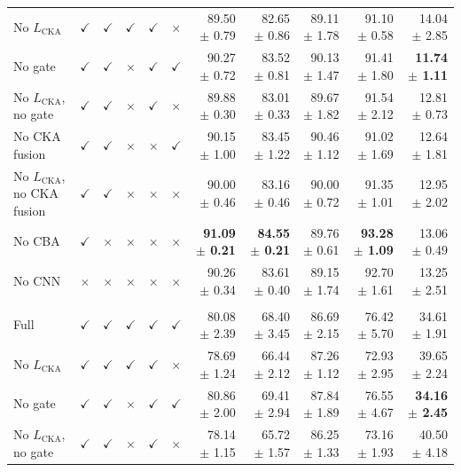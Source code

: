 \documentclass[10pt]{article}
\begin{document}
{\begin{longtable}{lccccc rrrrr}
No $L_{\mathrm{CKA}}$ & $\checkmark$ & $\checkmark$ & $\checkmark$ & $\checkmark$ & $\times$ & 89.50 $\pm$ 0.79 & 82.65 $\pm$ 0.86 & 89.11 $\pm$ 1.78 & 91.10 $\pm$ 0.58 & 14.04 $\pm$ 2.85 \\
No gate & $\checkmark$ & $\checkmark$ & $\times$ & $\checkmark$ & $\checkmark$ & 90.27 $\pm$ 0.72 & 83.52 $\pm$ 0.81 & 90.13 $\pm$ 1.47 & 91.41 $\pm$ 1.80 & \textbf{11.74 $\pm$ 1.11} \\
No $L_{\mathrm{CKA}}$, no gate & $\checkmark$ & $\checkmark$ & $\times$ & $\checkmark$ & $\times$ & 89.88 $\pm$ 0.30 & 83.01 $\pm$ 0.33 & 89.67 $\pm$ 1.82 & 91.54 $\pm$ 2.12 & 12.81 $\pm$ 0.73 \\
No CKA fusion & $\checkmark$ & $\checkmark$ & $\times$ & $\times$ & $\checkmark$ & 90.15 $\pm$ 1.00 & 83.45 $\pm$ 1.22 & 90.46 $\pm$ 1.12 & 91.02 $\pm$ 1.69 & 12.64 $\pm$ 1.81 \\
No $L_{\mathrm{CKA}}$, no CKA fusion & $\checkmark$ & $\checkmark$ & $\times$ & $\times$ & $\times$ & 90.00 $\pm$ 0.46 & 83.16 $\pm$ 0.46 & 90.00 $\pm$ 0.72 & 91.35 $\pm$ 1.01 & 12.95 $\pm$ 2.02 \\
No CBA & $\checkmark$ & $\times$ & $\times$ & $\times$ & $\times$ & \textbf{91.09 $\pm$ 0.21} & \textbf{84.55 $\pm$ 0.21} & 89.76 $\pm$ 0.61 & \textbf{93.28 $\pm$ 1.09} & 13.06 $\pm$ 0.49 \\
No CNN & $\times$ & $\times$ & $\times$ & $\times$ & $\times$ & 90.26 $\pm$ 0.34 & 83.61 $\pm$ 0.40 & 89.15 $\pm$ 1.74 & 92.70 $\pm$ 1.61 & 13.25 $\pm$ 2.51 \\
\addlinespace[4pt]
\multicolumn{11}{l}{\textit{Source: OVATUS $\rightarrow$ Target: USOVA}} \\
\midrule
Full & $\checkmark$ & $\checkmark$ & $\checkmark$ & $\checkmark$ & $\checkmark$ & 80.08 $\pm$ 2.39 & 68.40 $\pm$ 3.45 & 86.69 $\pm$ 2.15 & 76.42 $\pm$ 5.70 & 34.61 $\pm$ 1.91 \\
No $L_{\mathrm{CKA}}$ & $\checkmark$ & $\checkmark$ & $\checkmark$ & $\checkmark$ & $\times$ & 78.69 $\pm$ 1.24 & 66.44 $\pm$ 2.12 & 87.26 $\pm$ 1.12 & 72.93 $\pm$ 2.95 & 39.65 $\pm$ 2.24 \\
No gate & $\checkmark$ & $\checkmark$ & $\times$ & $\checkmark$ & $\checkmark$ & 80.86 $\pm$ 2.00 & 69.41 $\pm$ 2.94 & 87.84 $\pm$ 1.89 & 76.55 $\pm$ 4.67 & \textbf{34.16 $\pm$ 2.45} \\
No $L_{\mathrm{CKA}}$, no gate & $\checkmark$ & $\checkmark$ & $\times$ & $\checkmark$ & $\times$ & 78.14 $\pm$ 1.15 & 65.72 $\pm$ 1.57 & 86.25 $\pm$ 1.33 & 73.16 $\pm$ 1.93 & 40.50 $\pm$ 4.18 \\

\end{longtable}}
\end{document}
